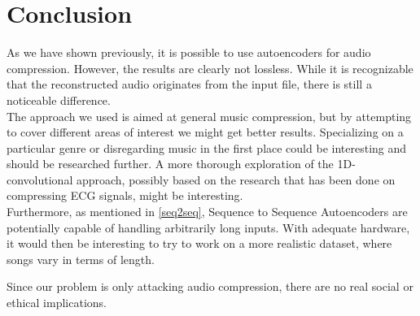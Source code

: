 \documentclass[11pt]{article}
\begin{document}
\section{Conclusion} \label{conclusion}
As we have shown previously, it is possible to use autoencoders for audio compression. However, the results are clearly not lossless. While it is recognizable that the reconstructed audio originates from the input file, there is still a noticeable difference.\\
The approach we used is aimed at general music compression, but by attempting to cover different areas of interest we might get better results. Specializing on a particular genre or disregarding music in the first place could be interesting and should be researched further. 
A more thorough exploration of the 1D-convolutional approach, possibly based on the research that has been done on compressing ECG signals, might be interesting.\\
Furthermore, as mentioned in \autoref{seq2seq}, Sequence to Sequence Autoencoders are potentially capable of handling arbitrarily long inputs. With adequate hardware, it would then be interesting to try to work on a more realistic dataset, where songs vary in terms of length.\par
Since our problem is only attacking audio compression, there are no real social or ethical implications. 

\cleardoublepage
\printbibliography
\end{document}
